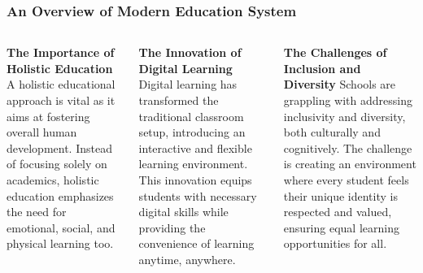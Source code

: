 \documentclass[5pt]{beamer}
\begin{document}
\begin{frame}
\frametitle{An Overview of Modern Education System}
\begin{columns}
\begin{column}{0.3\textwidth}
\begin{block}{\textbf{The Importance of Holistic Education}}
A holistic educational approach is vital as it aims at fostering overall human development. Instead of focusing solely on academics, holistic education emphasizes the need for emotional, social, and physical learning too.
\end{block}
\end{column}
\begin{column}{0.3\textwidth}
\begin{block}{\textbf{The Innovation of Digital Learning}}
Digital learning has transformed the traditional classroom setup, introducing an interactive and flexible learning environment. This innovation equips students with necessary digital skills while providing the convenience of learning anytime, anywhere.
\end{block}
\end{column}
\begin{column}{0.3\textwidth}
\begin{block}{\textbf{The Challenges of Inclusion and Diversity}}
Schools are grappling with addressing inclusivity and diversity, both culturally and cognitively. The challenge is creating an environment where every student feels their unique identity is respected and valued, ensuring equal learning opportunities for all.
\end{block}
\end{column}
\end{columns}
\end{frame}
\end{document}
